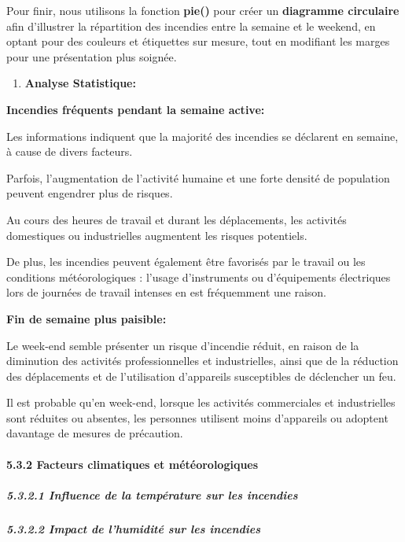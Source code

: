 \documentclass[
]{article}
\providecommand{\tightlist}{%
  \setlength{\itemsep}{0pt}\setlength{\parskip}{0pt}}
\begin{document}
Pour finir, nous utilisons la fonction \textbf{pie()} pour créer un
\textbf{diagramme circulaire} afin d'illustrer la répartition des
incendies entre la semaine et le weekend, en optant pour des couleurs et
étiquettes sur mesure, tout en modifiant les marges pour une
présentation plus soignée.

\begin{enumerate}
\def\labelenumi{\arabic{enumi}.}
\setcounter{enumi}{1}
\tightlist
\item
  \textbf{Analyse Statistique:}
\end{enumerate}

\textbf{Incendies fréquents pendant la semaine active:}

Les informations indiquent que la majorité des incendies se déclarent en
semaine, à cause de divers facteurs.

Parfois, l'augmentation de l'activité humaine et une forte densité de
population peuvent engendrer plus de risques.

Au cours des heures de travail et durant les déplacements, les activités
domestiques ou industrielles augmentent les risques potentiels.

De plus, les incendies peuvent également être favorisés par le travail
ou les conditions météorologiques : l'usage d'instruments ou
d'équipements électriques lors de journées de travail intenses en est
fréquemment une raison.

\textbf{Fin de semaine plus paisible:}

Le week-end semble présenter un risque d'incendie réduit, en raison de
la diminution des activités professionnelles et industrielles, ainsi que
de la réduction des déplacements et de l'utilisation d'appareils
susceptibles de déclencher un feu.

Il est probable qu'en week-end, lorsque les activités commerciales et
industrielles sont réduites ou absentes, les personnes utilisent moins
d'appareils ou adoptent davantage de mesures de précaution.

\paragraph{5.3.2 Facteurs climatiques et
météorologiques}\label{facteurs-climatiques-et-muxe9tuxe9orologiques}

\subparagraph{5.3.2.1 Influence de la température sur les
incendies}\label{influence-de-la-tempuxe9rature-sur-les-incendies}

\subparagraph{5.3.2.2 Impact de l'humidité sur les
incendies}\label{impact-de-lhumidituxe9-sur-les-incendies}
\end{document}
